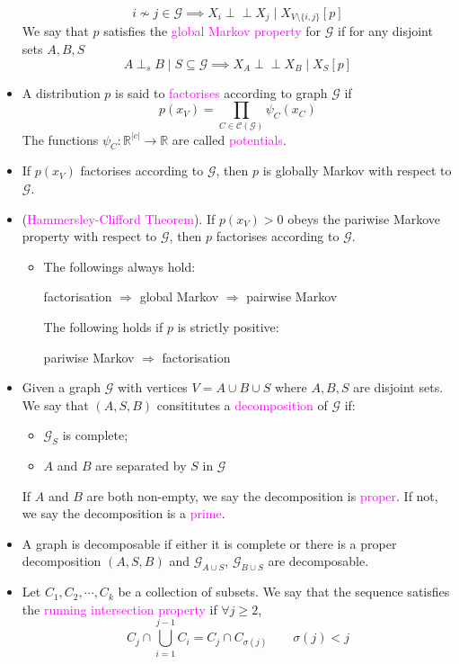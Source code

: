 \documentclass[UTF8]{book}
\newcommand{\perpp}{\ensuremath{\perp\!\!\!\!\perp}}
\newcommand{\concept}[1]{\textcolor{magenta}{#1}}
\begin{document}
\begin{itemize}
$$
i\not\sim j \in\mathcal{G} \implies X_i\perpp X_j\mid X_{V\setminus\{i,j\}}[p]
$$
We say that $p$ satisfies the \concept{global Markov property} for $\mathcal{G}$ if for any disjoint sets $A,B,S$
$$
A\perp_s B\mid S \subseteq\mathcal{G} \implies X_A\perpp X_B\mid X_S[p]
$$
\item A distribution $p$ is said to \concept{factorises} according to graph $\mathcal{G}$ if
$$
p(x_V) = \prod_{C\in\mathcal{C}(\mathcal{G})}\psi_C(x_C)
$$
The functions $\psi_C:\mathbb{R}^{|c|}\rightarrow \mathbb{R}$ are called \concept{potentials}.
\item If $p(x_V)$ factorises according to $\mathcal{G}$, then $p$ is globally Markov with respect to $\mathcal{G}$.
\item (\concept{Hammersley-Clifford Theorem}). If $p(x_V)>0$ obeys the pariwise Markove property with respect to $\mathcal{G}$, then $p$ factorises according to $\mathcal{G}$.
\begin{itemize}
	\item The followings always hold:
	\begin{center}
		factorisation $\Rightarrow$ global Markov $\Rightarrow$ pairwise Markov
	\end{center}
	The following holds if $p$ is strictly positive:
	\begin{center}
		pariwise Markov $\Rightarrow$ factorisation
	\end{center}
\end{itemize}
\item Given a graph $\mathcal{G}$ with vertices $V=A\cup B\cup S$ where $A,B,S$ are disjoint sets. We say that $(A,S,B)$ consititutes a \concept{decomposition} of $\mathcal{G}$ if:
\begin{itemize}
	\item $\mathcal{G}_S$ is complete;
	\item $A$ and $B$ are separated by $S$ in $\mathcal{G}$
\end{itemize}
If $A$ and $B$ are both non-empty, we say the decomposition is \concept{proper}. If not, we say the decomposition is a \concept{prime}.
\item A graph is decomposable if either it is complete or there is a proper decomposition $(A,S,B)$ and $\mathcal{G}_{A\cup S}$, $\mathcal{G}_{B\cup S}$ are decomposable.
\item Let $C_1,C_2,\cdots,C_k$ be a collection of subsets. We say that the sequence satisfies the \concept{running intersection property} if $\forall j\geq 2$,
$$
C_j\cap\bigcup_{i=1}^{j-1}C_i = C_j\cap C_{\sigma(j)} \qquad \sigma(j)<j
$$
\end{itemize}
\end{document}
